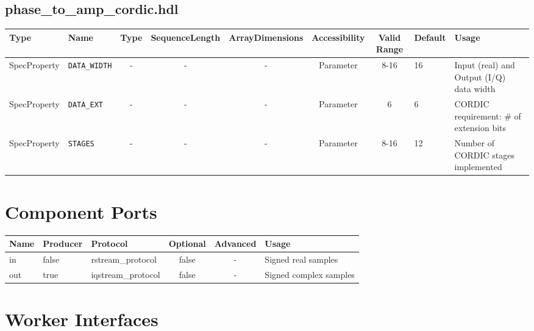 \documentclass{article}
\def\comp{phase\_to\_amp\_cordic}
\begin{document}
\begin{landscape}
	\subsection*{\comp.hdl}
	\begin{scriptsize}
		\begin{tabular}{|p{3cm}|p{2cm}|c|c|c|c|c|p{1cm}|p{6cm}|}
			\hline
			\rowcolor{blue}
			Type         & Name              & Type & SequenceLength & ArrayDimensions & Accessibility & Valid Range & Default & Usage                                    \\
			\hline
			SpecProperty & \verb+DATA_WIDTH+ & -    & -              & -               & Parameter     & 8-16        & 16      & Input (real) and Output (I/Q) data width \\
			\hline
			SpecProperty & \verb+DATA_EXT+   & -    & -              & -               & Parameter     & 6           & 6       & CORDIC requirement: \# of extension bits \\
			\hline
			SpecProperty & \verb+STAGES+     & -    & -              & -               & Parameter     & 8-16        & 12      & Number of CORDIC stages implemented      \\
			\hline
		\end{tabular}
	\end{scriptsize}

	\section*{Component Ports}
	\begin{scriptsize}
		\begin{tabular}{|M{2cm}|M{1.5cm}|M{4cm}|c|c|M{9cm}|}
			\hline
			\rowcolor{blue}
			Name & Producer & Protocol           & Optional & Advanced & Usage                  \\
			\hline
			in   & false    & rstream\_protocol  & false    & -        & Signed real samples    \\
			\hline
			out  & true     & iqstream\_protocol & false    & -        & Signed complex samples \\
			\hline
		\end{tabular}
	\end{scriptsize}
	\section*{Worker Interfaces}

\end{landscape}
\end{document}
